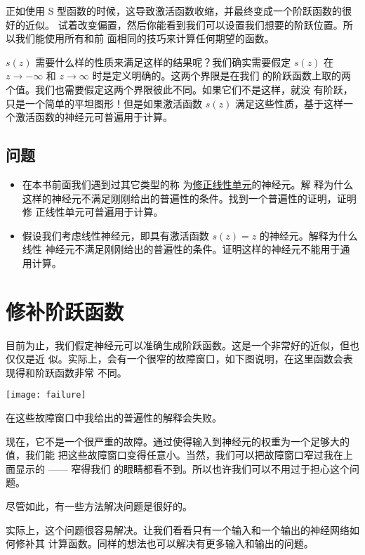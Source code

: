 正如使用 S 型函数的时候，这导致激活函数收缩，并最终变成一个阶跃函数的很好的近似。
试着改变偏置，然后你能看到我们可以设置我们想要的阶跃位置。所以我们能使用所有和前
面相同的技巧来计算任何期望的函数。

$s(z)$ 需要什么样的性质来满足这样的结果呢？我们确实需要假定 $s(z)$ 在 $z
\rightarrow -\infty$ 和 $z \rightarrow \infty$ 时是定义明确的。这两个界限是在我们
的阶跃函数上取的两个值。我们也需要假定这两个界限彼此不同。如果它们不是这样，就没
有阶跃，只是一个简单的平坦图形！但是如果激活函数 $s(z)$ 满足这些性质，基于这样一
个激活函数的神经元可普遍用于计算。

\subsection*{问题}

\begin{itemize}
\item 在本书前面我们遇到过其它类型的称
  为\hyperref[subsec:other_models_of_artificial_neuron]{修正线性单元}的神经元。解
  释为什么这样的神经元不满足刚刚给出的普遍性的条件。找到一个普遍性的证明，证明修
  正线性单元可普遍用于计算。
\item 假设我们考虑线性神经元，即具有激活函数 $s(z) = z$ 的神经元。解释为什么线性
  神经元不满足刚刚给出的普遍性的条件。证明这样的神经元不能用于通用计算。
\end{itemize}

\section{修补阶跃函数}
\label{sec:fixing_up_the_step_functions}

目前为止，我们假定神经元可以准确生成阶跃函数。这是一个非常好的近似，但也仅仅是近
似。实际上，会有一个很窄的故障窗口，如下图说明，在这里函数会表现得和阶跃函数非常
不同。
\begin{center}
  \texttt{[image: failure]}
\end{center}

在这些故障窗口中我给出的普遍性的解释会失败。

现在，它不是一个很严重的故障。通过使得输入到神经元的权重为一个足够大的值，我们能
把这些故障窗口变得任意小。当然，我们可以把故障窗口窄过我在上面显示的 —— 窄得我们
的眼睛都看不到。所以也许我们可以不用过于担心这个问题。

尽管如此，有一些方法解决问题是很好的。

实际上，这个问题很容易解决。让我们看看只有一个输入和一个输出的神经网络如何修补其
计算函数。同样的想法也可以解决有更多输入和输出的问题。

